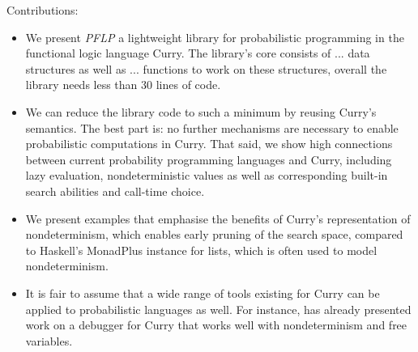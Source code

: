 \documentclass[
12pt, %
a4paper, %
oneside, %
]{llncs}
\begin{document}


Contributions:
\begin{itemize}
\item We present \emph{PFLP} a lightweight library for probabilistic
  programming in the functional logic language Curry. %
  The library's core consists of ... data structures as well as
  ... functions to work on these structures, overall the library needs
  less than 30 lines of code. %
\item We can reduce the library code to such a minimum by reusing Curry's
  semantics. %
  The best part is: no further mechanisms are necessary to enable
  probabilistic computations in Curry. %
  That said, we show high connections between current probability
  programming languages and Curry, including lazy evaluation,
  nondeterministic values as well as corresponding built-in search
  abilities and call-time choice. %
\item We present examples that emphasise the benefits of Curry's
  representation of nondeterminism, which enables early pruning of the
  search space, compared to Haskell's MonadPlus instance for lists,
  which is often used to model nondeterminism. %
\item It is fair to assume that a wide range of tools existing for
  Curry can be applied to probabilistic languages as well. %
  For instance, \cite{Brassel-BIO} has already presented work on a
  debugger for Curry that works well with nondeterminism and free
  variables. %
\end{itemize}
\end{document}
